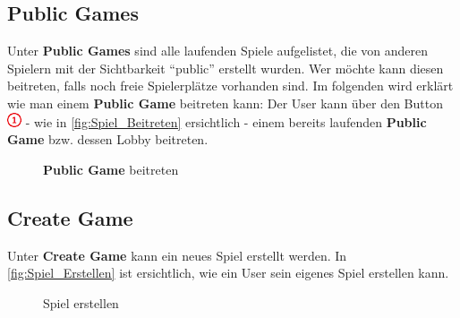 \documentclass[11pt,ngerman]{article}
\newcommand{\quotes}[1]{``#1''}
\begin{document}
    \subsection{Public Games}
    \label{ssec:PublicGames}
    Unter \textbf{Public Games} sind alle laufenden Spiele aufgelistet, die von anderen Spielern mit der Sichtbarkeit \quotes{public} erstellt wurden. Wer möchte kann diesen beitreten, falls noch freie Spielerplätze vorhanden sind. \newline
    Im folgenden wird erklärt wie man einem \textbf{Public Game} beitreten kann: \newline
    \newline
    Der User kann über den Button \includegraphics{figures/1.png} - wie in \autoref{fig:Spiel_Beitreten} ersichtlich - einem bereits laufenden \textbf{Public Game} bzw. dessen Lobby beitreten.

    \begin{figure}[H]
    	\centering
    	\caption{\textbf{Public Game} beitreten}
    	\label{fig:Spiel_Beitreten}
    \end{figure}

    \subsection{Create Game}
    Unter \textbf{Create Game} kann ein neues Spiel erstellt werden. \newline
    \newline
    In \autoref {fig:Spiel_Erstellen} ist ersichtlich, wie ein User sein eigenes Spiel erstellen kann.

	\begin{figure}[H]
		\centering
		\caption{Spiel erstellen}
		\label{fig:Spiel_Erstellen}
	\end{figure}
\end{document}
